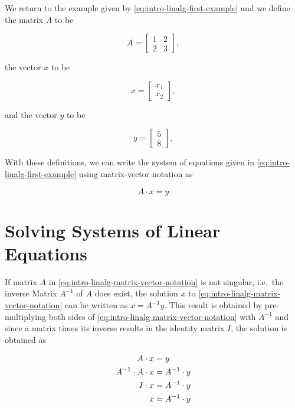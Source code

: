\documentclass[
]{book}
\begin{document}
We return to the example given by \eqref{eq:intro-linalg-first-example} and we define the matrix \(A\) to be

\[
A = \left[
\begin{array}{cc}
1  &  2 \\
2  &  3
\end{array}
\right], 
\]

the vector \(x\) to be

\[
x = \left[
\begin{array}{c}
x_1  \\
x_2  
\end{array}
\right], 
\]

and the vector \(y\) to be

\[
y = \left[
\begin{array}{c}
5  \\
8  
\end{array}
\right], 
\]

With these definitions, we can write the system of equations given in \eqref{eq:intro-linalg-first-example} using matrix-vector notation as

\begin{equation}
A \cdot x = y
\label{eq:intro-linalg-matrix-vector-notation}
\end{equation}

\hypertarget{intro-linalg-solving-systems-of-linear-equations}{%
\section{Solving Systems of Linear Equations}\label{intro-linalg-solving-systems-of-linear-equations}}

If matrix \(A\) in \eqref{eq:intro-linalg-matrix-vector-notation} is not singular, i.e.~the inverse Matrix \(A^{-1}\) of \(A\) does exist, the solution \(x\) to \eqref{eq:intro-linalg-matrix-vector-notation} can be written as \(x = A^{-1}y\). This result is obtained by pre-multiplying both sides of \eqref{eq:intro-linalg-matrix-vector-notation} with \(A^{-1}\) and since a matrix times its inverse results in the identity matrix \(I\), the solution is obtained as

\begin{align}
            A \cdot x  &=  y \notag \\
A^{-1}\cdot A \cdot x  &=  A^{-1} \cdot y \notag \\
            I \cdot x  &=  A^{-1} \cdot y \notag \\
                    x  &=  A^{-1} \cdot y
\label{eq:intro-linalg-matrix-vector-notation-solution-derivation}
\end{align}
\end{document}

